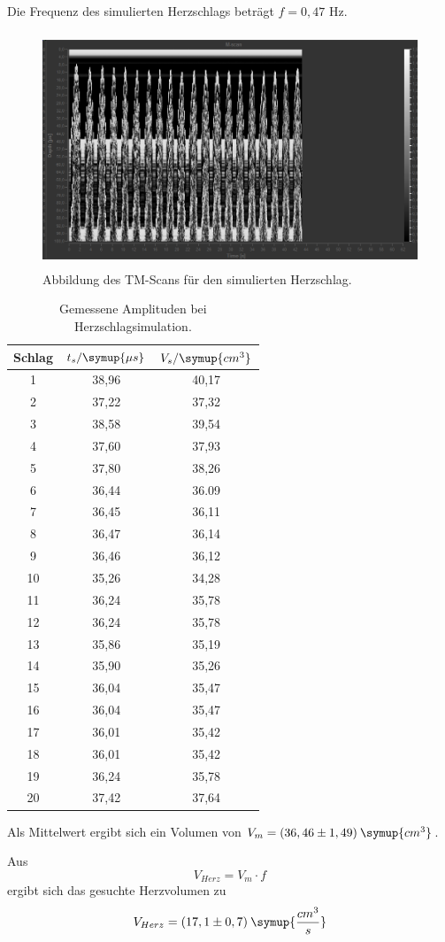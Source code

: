 Die Frequenz des simulierten Herzschlags beträgt $f = 0,47$ Hz.

\begin{figure}[H]
  \centering
  \includegraphics[height=7cm]{TM-Scan.PNG}
  \caption{Abbildung des TM-Scans für den simulierten Herzschlag.}
  \label{fig:TM}
\end{figure}

\begin{table}[H]
  \centering
  \caption{Gemessene Amplituden bei Herzschlagsimulation.}
  \label{tab:1}
  \begin{tabular}{c c c }
    \toprule
  Schlag & $t_s/\symup{\mu s}$ & $V_s/\symup{cm^3}$ \\
    \midrule
    1  &  38,96 & 40,17     \\
    2  &  37,22 & 37,32     \\
    3  &  38,58 & 39,54     \\
    4  &  37,60 & 37,93     \\
    5  &  37,80 & 38,26     \\
    6  &  36,44 & 36.09     \\
    7  &  36,45 & 36,11     \\
    8  &  36,47 & 36,14     \\
    9  &  36,46 & 36,12     \\
    10 &  35,26 & 34,28      \\
    11 &  36,24 & 35,78     \\
    12  &  36,24 & 35,78     \\
    13  &  35,86 & 35,19     \\
    14  &  35,90 & 35,26     \\
    15  &  36,04 & 35,47     \\
    16  &  36,04 & 35,47     \\
    17  &  36,01 & 35,42     \\
    18  &  36,01 & 35,42     \\
    19  &  36,24 & 35,78     \\
    20  &  37,42 & 37,64     \\
    \bottomrule
  \end{tabular}
\end{table}

Als Mittelwert ergibt sich ein Volumen von $V_{m} = (36,46 \pm 1,49) \: \symup{cm^3}$.

Aus
\begin{equation*}
  V_{Herz} = V_m \cdot f
\end{equation*}
ergibt sich das gesuchte Herzvolumen zu
\begin{equation*}
  V_{Herz} = (17,1 \pm 0,7) \: \symup{\frac{cm^3}{s}}
\end{equation*}
